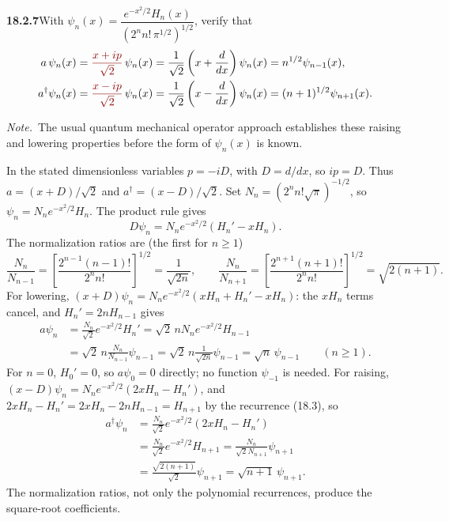 \par\bigskip
\noindent\textbf{18.2.7}\quad With
$\psi_{n}(x)=\dfrac{e^{-x^{2}/2}H_{n}(x)}{(2^{n}n!\,\pi^{1/2})^{1/2}}$,
verify that
\begin{align*}
a\,\psi_{n}(x)
&=\erratum{\frac{x+ip}{\sqrt{2}}}\,\psi_{n}(x)
=\frac{1}{\sqrt{2}}\left(x+\frac{d}{dx}\right)\psi_{n}(x)
=n^{1/2}\psi_{n-1}(x),\\
a^{\dagger}\psi_{n}(x)
&=\erratum{\frac{x-ip}{\sqrt{2}}}\,\psi_{n}(x)
=\frac{1}{\sqrt{2}}\left(x-\frac{d}{dx}\right)\psi_{n}(x)
=(n+1)^{1/2}\psi_{n+1}(x).
\end{align*}
\par\emph{Note.}~The usual quantum mechanical operator approach
establishes these raising and lowering properties before the form of
$\psi_{n}(x)$ is known.
\par\nobreak
\solution
{}\par

In the stated dimensionless variables $p=-iD$, with $D=d/dx$, so
$ip=D$.
Thus $a=(x+D)/\sqrt2$ and $a^\dagger=(x-D)/\sqrt2$.
  Set $N_n=(2^nn!\sqrt\pi)^{-1/2}$, so
$\psi_n=N_ne^{-x^2/2}H_n$.  The product rule gives
\[
D\psi_n=N_ne^{-x^2/2}(H_n'-xH_n).
\]
The normalization ratios are (the first for $n\ge1$)
\[
\frac{N_n}{N_{n-1}}=\left[\frac{2^{n-1}(n-1)!}{2^nn!}\right]^{1/2}
 =\frac1{\sqrt{2n}},\qquad
\frac{N_n}{N_{n+1}}=\left[\frac{2^{n+1}(n+1)!}{2^nn!}\right]^{1/2}
 =\sqrt{2(n+1)}.
\]
For lowering, $(x+D)\psi_n=N_ne^{-x^2/2}(xH_n+H_n'-xH_n)$: the $xH_n$
terms cancel, and $H_n'=2nH_{n-1}$ gives
\begin{align*}
a\psi_n
 &=\frac{N_n}{\sqrt2}e^{-x^2/2}H_n'
 =\sqrt2\,nN_ne^{-x^2/2}H_{n-1}\\
 &=\sqrt2\,n\frac{N_n}{N_{n-1}}\psi_{n-1}
 =\sqrt2\,n\frac1{\sqrt{2n}}\psi_{n-1}
 =\boxed{\sqrt n\,\psi_{n-1}}\qquad(n\ge1).
\end{align*}
For $n=0$, $H_0'=0$, so $a\psi_0=0$ directly; no function
$\psi_{-1}$ is needed.  For raising,
$(x-D)\psi_n=N_ne^{-x^2/2}(2xH_n-H_n')$, and
$2xH_n-H_n'=2xH_n-2nH_{n-1}=H_{n+1}$ by the recurrence (18.3), so
\begin{align*}
a^\dagger\psi_n
 &=\frac{N_n}{\sqrt2}e^{-x^2/2}(2xH_n-H_n')\\
 &=\frac{N_n}{\sqrt2}e^{-x^2/2}H_{n+1}
 =\frac{N_n}{\sqrt2N_{n+1}}\psi_{n+1}\\
 &=\frac{\sqrt{2(n+1)}}{\sqrt2}\psi_{n+1}
 =\boxed{\sqrt{n+1}\,\psi_{n+1}}.
\end{align*}
The normalization ratios, not only the polynomial recurrences,
produce the square-root coefficients.


